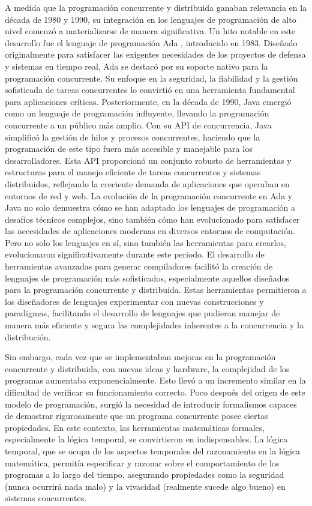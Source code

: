 A medida que la programación concurrente y distribuida ganaban relevancia en la década de 1980 y 1990, su integración en los lenguajes de programación de alto nivel comenzó a materializarse de manera significativa. Un hito notable en este desarrollo fue el lenguaje de programación Ada \cite{burns1998concurrency}, introducido en 1983. Diseñado originalmente para satisfacer las exigentes necesidades de los proyectos de defensa y sistemas en tiempo real, Ada se destacó por su soporte nativo para la programación concurrente. Su enfoque en la seguridad, la fiabilidad y la gestión sofisticada de tareas concurrentes lo convirtió en una herramienta fundamental para aplicaciones críticas. Posteriormente, en la década de 1990, Java emergió como un lenguaje de programación influyente, llevando la programación concurrente a un público más amplio. Con su API de concurrencia, Java simplificó la gestión de hilos y procesos concurrentes, haciendo que la programación de este tipo fuera más accesible y manejable para los desarrolladores. Esta API proporcionó un conjunto robusto de herramientas y estructuras para el manejo eficiente de tareas concurrentes y sistemas distribuidos, reflejando la creciente demanda de aplicaciones que operaban en entornos de red y web. La evolución de la programación concurrente en Ada y Java no solo demuestra cómo se han adaptado los lenguajes de programación a desafíos técnicos complejos, sino también cómo han evolucionado para satisfacer las necesidades de aplicaciones modernas en diversos entornos de computación. Pero no solo los lenguajes en sí, sino también las herramientas para crearlos, evolucionaron significativamente durante este periodo. El desarrollo de herramientas avanzadas para generar compiladores facilitó la creación de lenguajes de programación más sofisticados, especialmente aquellos diseñados para la programación concurrente y distribuida. Estas herramientas permitieron a los diseñadores de lenguajes experimentar con nuevas construcciones y paradigmas, facilitando el desarrollo de lenguajes que pudieran manejar de manera más eficiente y segura las complejidades inherentes a la concurrencia y la distribución. 


Sin embargo, cada vez que se implementaban mejoras en la programación concurrente y distribuida, con nuevas ideas y hardware, la complejidad de los programas aumentaba exponencialmente. Esto llevó a un incremento similar en la dificultad de verificar su funcionamiento correcto. Poco después del origen de este modelo de programación, surgió la necesidad de introducir formalismos capaces de demostrar rigurosamente que un programa concurrente posee ciertas propiedades. En este contexto, las herramientas matemáticas formales, especialmente la lógica temporal, se convirtieron en indispensables. La lógica temporal, que se ocupa de los aspectos temporales del razonamiento en la lógica matemática, permitía especificar y razonar sobre el comportamiento de los programas a lo largo del tiempo, asegurando propiedades como la seguridad (nunca ocurrirá nada malo) y la vivacidad (realmente sucede algo bueno) en sistemas concurrentes.


